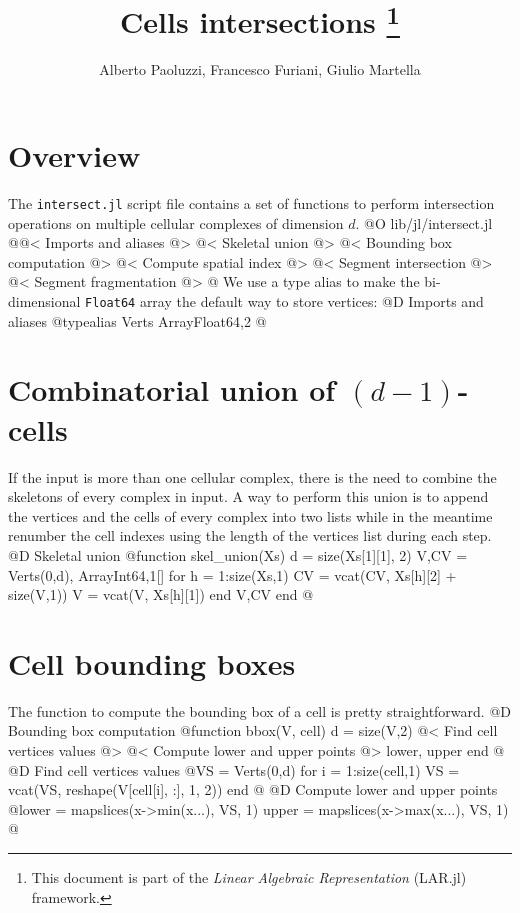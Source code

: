 \documentclass[10pt,oneside]{article}
\author{Alberto Paoluzzi, Francesco Furiani, Giulio Martella}
\title{Cells intersections
\footnote{This document is part of the \emph{Linear Algebraic Representation} (LAR.jl) framework.}
}
\begin{document}
\maketitle
\newpage

\section{Overview}
The \texttt{intersect.jl} script file contains a set of functions to perform intersection
operations on multiple cellular complexes of dimension $d$.
@O lib/jl/intersect.jl
@{@< Imports and aliases @>
@< Skeletal union @>
@< Bounding box computation @>
@< Compute spatial index @>
@< Segment intersection @>
@< Segment fragmentation @>
@}
We use a type alias to make the bi-dimensional \texttt{Float64} array 
the default way to store vertices:
@D Imports and aliases
@{typealias Verts Array{Float64,2}
@}

\section{Combinatorial union of $(d-1)$-cells}
If the input is more than one cellular complex, there is the need to combine 
the skeletons of every complex in input. A way to perform this union is to append
the vertices and the cells of every complex into two lists while in the meantime 
renumber the cell indexes using the length of the vertices list during each step.
@D Skeletal union
@{function skel_union(Xs)
    d = size(Xs[1][1], 2)
    V,CV = Verts(0,d), Array{Int64,1}[]
    for h = 1:size(Xs,1)
        CV = vcat(CV, Xs[h][2] + size(V,1))
        V = vcat(V, Xs[h][1])
    end
    V,CV
end
@}

\section{Cell bounding boxes}
The function to compute the bounding box of a cell
is pretty straightforward.
@D Bounding box computation
@{function bbox(V, cell)
    d = size(V,2)
    @< Find cell vertices values @>
    @< Compute lower and upper points @>
    lower, upper
end
@}
@D Find cell vertices values
@{VS = Verts(0,d)
for i = 1:size(cell,1)
    VS = vcat(VS, reshape(V[cell[i], :], 1, 2))
end
@}
@D Compute lower and upper points
@{lower = mapslices(x->min(x...), VS, 1)
upper = mapslices(x->max(x...), VS, 1)
@}

\end{document}
